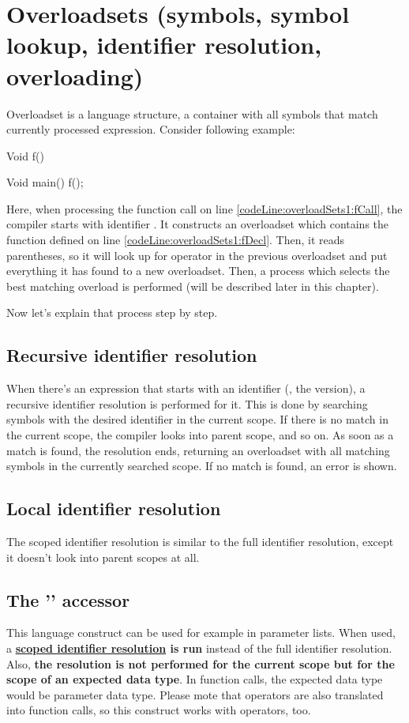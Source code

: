 \section{Overloadsets (symbols, symbol lookup, identifier resolution, overloading)}
Overloadset is a language structure, a container with all symbols that match currently processed expression. Consider following example:

\begin{code}
Void f() {}$\label{codeLine:overloadSets1:fDecl}$

Void main() {
	f();$\label{codeLine:overloadSets1:fCall}$	
}
\end{code}

Here, when processing the function call on line \ref{codeLine:overloadSets1:fCall}, the compiler starts with identifier . It constructs an overloadset which contains the function  defined on line \ref{codeLine:overloadSets1:fDecl}. Then, it reads parentheses, so it will look up for operator  in the previous overloadset and put everything it has found to a new overloadset. Then, a process which selects the best matching overload is performed (will be described later in this chapter).

Now let's explain that process step by step.

\subsection{Recursive identifier resolution} \label{fullIdentifierResolution}
When there's an expression that starts with an identifier (, the  version), a recursive identifier resolution is performed for it. This is done by searching symbols with the desired identifier in the current scope. If there is no match in the current scope, the compiler looks into parent scope, and so on. As soon as a match is found, the resolution ends, returning an overloadset with all matching symbols in the currently searched scope. If no match is found, an error is shown.

\subsection{Local identifier resolution} \label{scopedIdentifierResolution}
The scoped identifier resolution is similar to the full identifier resolution, except it doesn't look into parent scopes at all.

\subsection{The '' accessor} \label{colonAccessor}
This language construct can be used for example in parameter lists. When used, a \textbf{\hyperref[scopedIdentifierResolution]{scoped identifier resolution} is run} instead of the full identifier resolution. Also, \textbf{the resolution is not performed for the current scope but for the scope of an expected data type}. In function calls, the expected data type would be parameter data type. Please mote that operators are also translated into function calls, so this construct works with operators, too.

